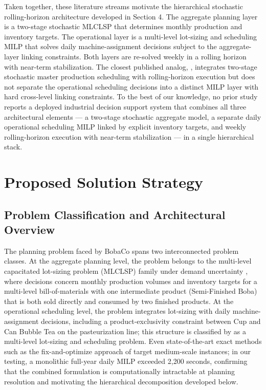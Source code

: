 \documentclass[11pt]{article}
\begin{document}
\indent Taken together, these literature streams motivate the hierarchical stochastic rolling-horizon architecture developed in Section 4. The aggregate planning layer is a two-stage stochastic MLCLSP that determines monthly production and inventory targets. The operational layer is a multi-level lot-sizing and scheduling MILP that solves daily machine-assignment decisions subject to the aggregate-layer linking constraints. Both layers are re-solved weekly in a rolling horizon with near-term stabilization. The closest published analog, \cite{englberger2016stochastic}, integrates two-stage stochastic master production scheduling with rolling-horizon execution but does not separate the operational scheduling decisions into a distinct MILP layer with hard cross-level linking constraints. To the best of our knowledge, no prior study reports a deployed industrial decision support system that combines all three architectural elements --- a two-stage stochastic aggregate model, a separate daily operational scheduling MILP linked by explicit inventory targets, and weekly rolling-horizon execution with near-term stabilization --- in a single hierarchical stack.\\


\section{Proposed Solution Strategy}
\subsection{Problem Classification and Architectural Overview}

The planning problem faced by BobaCo spans two interconnected problem classes. At the aggregate planning level, the problem belongs to the multi-level capacitated lot-sizing problem (MLCLSP) family under demand uncertainty \citep{billington1983mlclsp, karimi2003cls, maes1991mlcls, korpeoglu2011}, where decisions concern monthly production volumes and inventory targets for a multi-level bill-of-materials with one intermediate product (Semi-Finished Boba) that is both sold directly and consumed by two finished products. At the operational scheduling level, the problem integrates lot-sizing with daily machine-assignment decisions, including a product-exclusivity constraint between Cup and Can Bubble Tea on the pasteurization line; this structure is classified by \cite{drexl1997lss} as a multi-level lot-sizing and scheduling problem. Even state-of-the-art exact methods such as the fix-and-optimize approach of \cite{helber2010mlclsp} target medium-scale instances; in our testing, a monolithic full-year daily MILP exceeded 2,200 seconds, confirming that the combined formulation is computationally intractable at planning resolution and motivating the hierarchical decomposition developed below.
\end{document}

